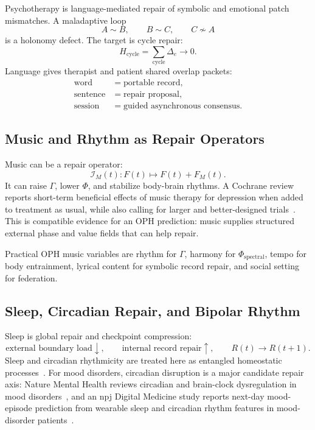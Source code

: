 \documentclass[11pt]{article}
\theoremstyle{remark}
\theoremstyle{plain}
\begin{document}
Psychotherapy is language-mediated repair of symbolic and emotional patch mismatches. A maladaptive loop
\[
A\sim B,\qquad B\sim C,\qquad C\not\sim A
\]
is a holonomy defect. The target is cycle repair:
\[
H_{\mathrm{cycle}}=\sum_{\mathrm{cycle}}\Delta_e\to0.
\]
Language gives therapist and patient shared overlap packets:
\[
\begin{aligned}
\text{word}&=\text{portable record},\\
\text{sentence}&=\text{repair proposal},\\
\text{session}&=\text{guided asynchronous consensus}.
\end{aligned}
\]

\subsection{Music and Rhythm as Repair Operators}

Music can be a repair operator:
\[
\mathcal I_M(t):F(t)\mapsto F(t)+F_M(t).
\]
It can raise \(\Gamma\), lower \(\Phi\), and stabilize body-brain rhythms. A Cochrane review reports short-term beneficial effects of music therapy for depression when added to treatment as usual, while also calling for larger and better-designed trials~\cite{Aalbers2017}. This is compatible evidence for an OPH prediction: music supplies structured external phase and value fields that can help repair.

Practical OPH music variables are rhythm for \(\Gamma\), harmony for \(\Phi_{\mathrm{spectral}}\), tempo for body entrainment, lyrical content for symbolic record repair, and social setting for federation.

\subsection{Sleep, Circadian Repair, and Bipolar Rhythm}

Sleep is global repair and checkpoint compression:
\[
\text{external boundary load}\downarrow,
\qquad
\text{internal record repair}\uparrow,
\qquad
R(t)\to R(t+1).
\]
Sleep and circadian rhythmicity are treated here as entangled homeostatic processes~\cite{FrankenDijk2024}. For mood disorders, circadian disruption is a major candidate repair axis: Nature Mental Health reviews circadian and brain-clock dysregulation in mood disorders~\cite{Mendoza2024}, and an npj Digital Medicine study reports next-day mood-episode prediction from wearable sleep and circadian rhythm features in mood-disorder patients~\cite{Kim2024MoodWearable}.
\end{document}
